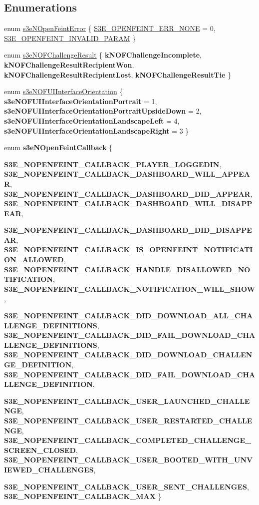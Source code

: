 \subsection*{Enumerations}
\begin{DoxyCompactItemize}
\item 
enum \hyperlink{group___n_open_feint_api_group_ga6ef9ed4c26e06a1b4d5b3d0004ea28bd}{s3eNOpenFeintError} \{ \hyperlink{group___n_open_feint_api_group_gga6ef9ed4c26e06a1b4d5b3d0004ea28bda018802c719a4ef52c8336d5c320e5d93}{S3E\_\-OPENFEINT\_\-ERR\_\-NONE} =  0, 
\hyperlink{group___n_open_feint_api_group_gga6ef9ed4c26e06a1b4d5b3d0004ea28bdaacb2649c2babd512a412065e906109c4}{S3E\_\-OPENFEINT\_\-INVALID\_\-PARAM}
 \}
\item 
enum \hyperlink{group___n_open_feint_api_group_ga954444cdbeafa2947e969f78ed1e29f4}{s3eNOFChallengeResult} \{ {\bfseries kNOFChallengeIncomplete}, 
{\bfseries kNOFChallengeResultRecipientWon}, 
{\bfseries kNOFChallengeResultRecipientLost}, 
{\bfseries kNOFChallengeResultTie}
 \}
\item 
enum \hyperlink{group___n_open_feint_api_group_gac32b01451990bbfa1b6e2fe38e01262b}{s3eNOFUIInterfaceOrientation} \{ {\bfseries s3eNOFUIInterfaceOrientationPortrait} =  1, 
{\bfseries s3eNOFUIInterfaceOrientationPortraitUpsideDown} =  2, 
{\bfseries s3eNOFUIInterfaceOrientationLandscapeLeft} =  4, 
{\bfseries s3eNOFUIInterfaceOrientationLandscapeRight} =  3
 \}
\item 
enum {\bfseries s3eNOpenFeintCallback} \{ \par
{\bfseries S3E\_\-NOPENFEINT\_\-CALLBACK\_\-PLAYER\_\-LOGGEDIN}, 
{\bfseries S3E\_\-NOPENFEINT\_\-CALLBACK\_\-DASHBOARD\_\-WILL\_\-APPEAR}, 
{\bfseries S3E\_\-NOPENFEINT\_\-CALLBACK\_\-DASHBOARD\_\-DID\_\-APPEAR}, 
{\bfseries S3E\_\-NOPENFEINT\_\-CALLBACK\_\-DASHBOARD\_\-WILL\_\-DISAPPEAR}, 
\par
{\bfseries S3E\_\-NOPENFEINT\_\-CALLBACK\_\-DASHBOARD\_\-DID\_\-DISAPPEAR}, 
{\bfseries S3E\_\-NOPENFEINT\_\-CALLBACK\_\-IS\_\-OPENFEINT\_\-NOTIFICATION\_\-ALLOWED}, 
{\bfseries S3E\_\-NOPENFEINT\_\-CALLBACK\_\-HANDLE\_\-DISALLOWED\_\-NOTIFICATION}, 
{\bfseries S3E\_\-NOPENFEINT\_\-CALLBACK\_\-NOTIFICATION\_\-WILL\_\-SHOW}, 
\par
{\bfseries S3E\_\-NOPENFEINT\_\-CALLBACK\_\-DID\_\-DOWNLOAD\_\-ALL\_\-CHALLENGE\_\-DEFINITIONS}, 
{\bfseries S3E\_\-NOPENFEINT\_\-CALLBACK\_\-DID\_\-FAIL\_\-DOWNLOAD\_\-CHALLENGE\_\-DEFINITIONS}, 
{\bfseries S3E\_\-NOPENFEINT\_\-CALLBACK\_\-DID\_\-DOWNLOAD\_\-CHALLENGE\_\-DEFINITION}, 
{\bfseries S3E\_\-NOPENFEINT\_\-CALLBACK\_\-DID\_\-FAIL\_\-DOWNLOAD\_\-CHALLENGE\_\-DEFINITION}, 
\par
{\bfseries S3E\_\-NOPENFEINT\_\-CALLBACK\_\-USER\_\-LAUNCHED\_\-CHALLENGE}, 
{\bfseries S3E\_\-NOPENFEINT\_\-CALLBACK\_\-USER\_\-RESTARTED\_\-CHALLENGE}, 
{\bfseries S3E\_\-NOPENFEINT\_\-CALLBACK\_\-COMPLETED\_\-CHALLENGE\_\-SCREEN\_\-CLOSED}, 
{\bfseries S3E\_\-NOPENFEINT\_\-CALLBACK\_\-USER\_\-BOOTED\_\-WITH\_\-UNVIEWED\_\-CHALLENGES}, 
\par
{\bfseries S3E\_\-NOPENFEINT\_\-CALLBACK\_\-USER\_\-SENT\_\-CHALLENGES}, 
{\bfseries S3E\_\-NOPENFEINT\_\-CALLBACK\_\-MAX}
 \}
\end{DoxyCompactItemize}
